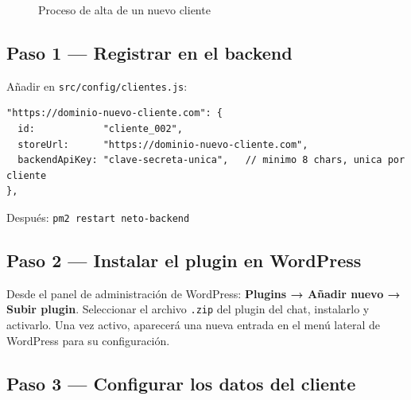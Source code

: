 \documentclass[12pt, a4paper]{article}
\begin{document}
\begin{figure}[h]
\centering
{}
\caption{Proceso de alta de un nuevo cliente}
\end{figure}

\subsection{Paso 1 --- Registrar en el backend}

Añadir en \texttt{src/config/clientes.js}:

\begin{lstlisting}[style=js]
"https://dominio-nuevo-cliente.com": {
  id:            "cliente_002",
  storeUrl:      "https://dominio-nuevo-cliente.com",
  backendApiKey: "clave-secreta-unica",   // minimo 8 chars, unica por cliente
},
\end{lstlisting}

Después: \texttt{pm2 restart neto-backend}

\subsection{Paso 2 --- Instalar el plugin en WordPress}

Desde el panel de administración de WordPress: \textbf{Plugins → Añadir nuevo → Subir plugin}. Seleccionar el archivo \texttt{.zip} del plugin del chat, instalarlo y activarlo. Una vez activo, aparecerá una nueva entrada en el menú lateral de WordPress para su configuración.

\subsection{Paso 3 --- Configurar los datos del cliente}
\end{document}
